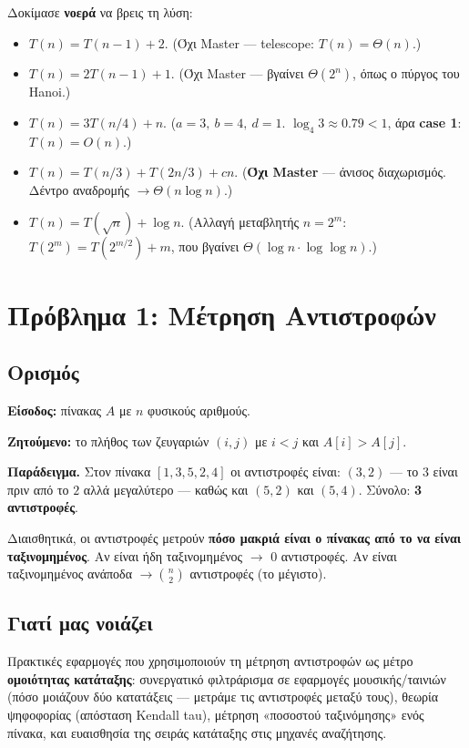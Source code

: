 \documentclass[11pt,a4paper]{article}
\begin{document}
Δοκίμασε \textbf{νοερά} να βρεις τη λύση:
\begin{itemize}
  \item $T(n) = T(n-1) + 2$. (Όχι Master --- telescope: $T(n) = \Theta(n)$.)
  \item $T(n) = 2T(n-1) + 1$. (Όχι Master --- βγαίνει $\Theta(2^n)$, όπως ο
  πύργος του Hanoi.)
  \item $T(n) = 3T(n/4) + n$. ($a = 3,\ b = 4,\ d = 1$. $\log_4 3 \approx 0.79 <
  1$, άρα \textbf{case 1}: $T(n) = O(n)$.)
  \item $T(n) = T(n/3) + T(2n/3) + cn$. (\textbf{Όχι Master} --- άνισος
  διαχωρισμός. Δέντρο αναδρομής $\to \Theta(n \log n)$.)
  \item $T(n) = T(\sqrt{n}) + \log n$. (Αλλαγή μεταβλητής $n = 2^m$:
  $T(2^m) = T(2^{m/2}) + m$, που βγαίνει $\Theta(\log n \cdot \log \log n)$.)
\end{itemize}

\section{Πρόβλημα 1: Μέτρηση Αντιστροφών}

\subsection{Ορισμός}

\textbf{Είσοδος:} πίνακας $A$ με $n$ φυσικούς αριθμούς.

\textbf{Ζητούμενο:} το πλήθος των ζευγαριών $(i, j)$ με $i < j$ και
$A[i] > A[j]$.

\textbf{Παράδειγμα.} Στον πίνακα $[1, 3, 5, 2, 4]$ οι αντιστροφές είναι:
$(3, 2)$ --- το $3$ είναι πριν από το $2$ αλλά μεγαλύτερο --- καθώς και $(5, 2)$
και $(5, 4)$. Σύνολο: \textbf{3 αντιστροφές}.

\begin{intuition}
Διαισθητικά, οι αντιστροφές μετρούν \textbf{πόσο μακριά είναι ο πίνακας από το να
είναι ταξινομημένος}. Αν είναι ήδη ταξινομημένος $\to$ 0 αντιστροφές. Αν είναι
ταξινομημένος ανάποδα $\to \binom{n}{2}$ αντιστροφές (το μέγιστο).
\end{intuition}

\subsection{Γιατί μας νοιάζει}

Πρακτικές εφαρμογές που χρησιμοποιούν τη μέτρηση αντιστροφών ως μέτρο
\textbf{ομοιότητας κατάταξης}: συνεργατικό φιλτράρισμα σε εφαρμογές
μουσικής/ταινιών (πόσο μοιάζουν δύο κατατάξεις --- μετράμε τις αντιστροφές μεταξύ
τους), θεωρία ψηφοφορίας (απόσταση Kendall tau), μέτρηση «ποσοστού ταξινόμησης»
ενός πίνακα, και ευαισθησία της σειράς κατάταξης στις μηχανές αναζήτησης.
\end{document}
